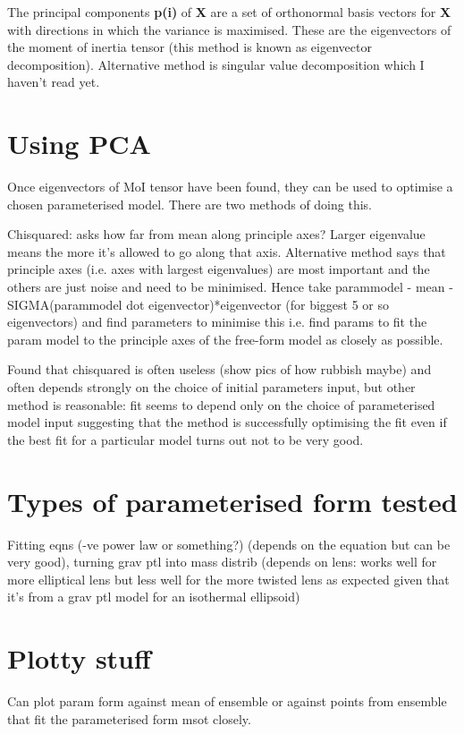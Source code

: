 \documentclass{article}
\begin{document}
The principal components \textbf{p(i)} of \textbf{X} are a set of orthonormal basis vectors for \textbf{X} with directions in which the variance is maximised. These are the eigenvectors of the moment of inertia tensor (this method is known as eigenvector decomposition). Alternative method is singular value decomposition which I haven't read yet.

\section{Using PCA}
Once eigenvectors of MoI tensor have been found, they can be used to optimise a chosen parameterised model. There are two methods of doing this.

Chisquared: asks how far from mean along principle axes? Larger eigenvalue means the more it's allowed to go along that axis. 
Alternative method says that principle axes (i.e. axes with largest eigenvalues) are most important and the others are just noise and need to be minimised. Hence take parammodel - mean - SIGMA(parammodel dot eigenvector)*eigenvector (for biggest 5 or so eigenvectors) and find parameters to minimise this i.e. find params to fit the param model to the principle axes of the free-form model as closely as possible.

Found that chisquared is often useless (show pics of how rubbish maybe) and often depends strongly on the choice of initial parameters input, but other method is reasonable: fit seems to depend only on the choice of parameterised model input suggesting that the method is successfully optimising the fit even if the best fit for a particular model turns out not to be very good.

\section{Types of parameterised form tested}
Fitting eqns (-ve power law or something?) (depends on the equation but can be very good), 
turning grav ptl into mass distrib (depends on lens: works well for more elliptical lens but less well for the more twisted lens as expected given that it's from a grav ptl model for an isothermal ellipsoid)

\section{Plotty stuff}
Can plot param form against mean of ensemble or against points from ensemble that fit the parameterised form msot closely.
\end{document}
